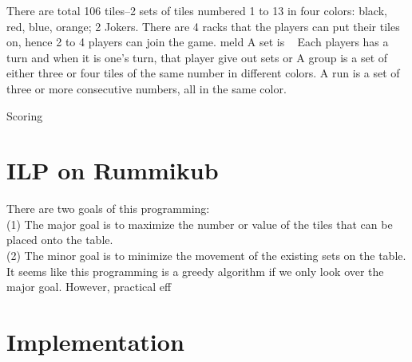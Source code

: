 \documentclass[11pt]{article}
\begin{document}
	
	There are total 106 tiles--2 sets of tiles numbered 1 to 13 in four colors: black, red, blue, orange; 2 Jokers. There are 4 racks that the players can put their tiles on, hence 2 to 4 players can join the game.
	meld
	A set is ~
	Each players has a turn and when it is one's turn, that player give out sets or 
	A group is a set of either three or four tiles of the same number in different colors.
	A run is a set of three or more consecutive numbers, all in the same color.
	
	Scoring 
	
	
	\section{ILP on Rummikub}\label{section-ILP imp}
	
	There are two goals of this programming:\\
	(1) The major goal is to maximize the number or value of the tiles that can be placed onto the table.\\
	(2) The minor goal is to minimize the movement of the existing sets on the table.\\
	It seems like this programming is a greedy algorithm if we only look over the major goal. However, practical eff	
	


	\section{Implementation}\label{section-spaces}
	
	
	
\end{document}
